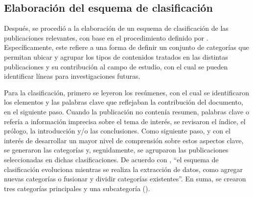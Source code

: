\subsection{Elaboración del esquema de clasificación}\label{sub-sec-elaboracion-del-esquema-de-clasificacion}


Después, se procedió a la elaboración de un esquema de clasificación de
las publicaciones relevantes, con base en el procedimiento definido por
\textcite{Petersen2008SystematicMapping}. Específicamente, este refiere a una forma
de definir un conjunto de categorías que permitan ubicar y agrupar los
tipos de contenidos tratados en las distintas publicaciones y su
contribución al campo de estudio, con el cual se pueden identificar
líneas para investigaciones futuras.

Para la clasificación, primero se leyeron los resúmenes, con el cual se
identificaron los elementos y las palabras clave que reflejaban la
contribución del documento, en el siguiente paso. Cuando la publicación
no contenía resumen, palabras clave o refería a información imprecisa
sobre el tema de interés, se revisaron el índice, el prólogo, la
introducción y/o las conclusiones. Como siguiente paso, y con el interés
de desarrollar un mayor nivel de comprensión sobre estos aspectos clave,
se generaron las categorías y, seguidamente, se agruparon las
publicaciones seleccionadas en dichas clasificaciones. De acuerdo con
\textcite[p.~5]{Petersen2008SystematicMapping}, ``el esquema de clasificación evoluciona
mientras se realiza la extracción de datos, como agregar nuevas
categorías o fusionar y dividir categorías existentes''. En suma,
se crearon tres categorías principales y una subcategoría ().

